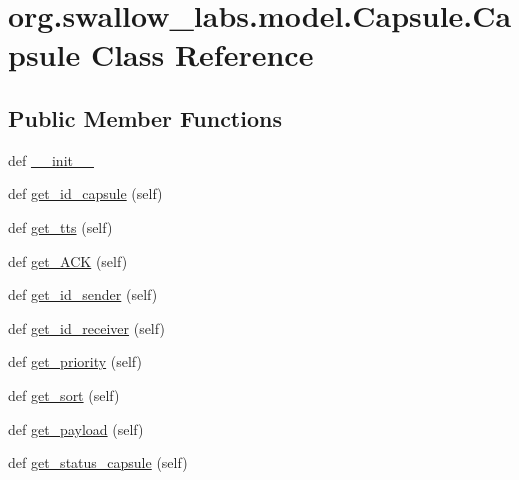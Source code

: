 \hypertarget{classorg_1_1swallow__labs_1_1model_1_1_capsule_1_1_capsule}{}\section{org.\+swallow\+\_\+labs.\+model.\+Capsule.\+Capsule Class Reference}
\label{classorg_1_1swallow__labs_1_1model_1_1_capsule_1_1_capsule}
\subsection*{Public Member Functions}
\begin{DoxyCompactItemize}
\item 
def \hyperlink{classorg_1_1swallow__labs_1_1model_1_1_capsule_1_1_capsule_a3dbf49bb0dee95d96d69f45d07dcffaf}{\+\_\+\+\_\+init\+\_\+\+\_\+}
\item 
def \hyperlink{classorg_1_1swallow__labs_1_1model_1_1_capsule_1_1_capsule_a3a1a40328823c7c3966528d43b2d0d84}{get\+\_\+id\+\_\+capsule} (self)
\item 
def \hyperlink{classorg_1_1swallow__labs_1_1model_1_1_capsule_1_1_capsule_a27bc4bb32feefe56085584994867a7ae}{get\+\_\+tts} (self)
\item 
def \hyperlink{classorg_1_1swallow__labs_1_1model_1_1_capsule_1_1_capsule_a9f37e86eb595e28f7d3021cb04b5bd1a}{get\+\_\+\+A\+C\+K} (self)
\item 
def \hyperlink{classorg_1_1swallow__labs_1_1model_1_1_capsule_1_1_capsule_ae9f636fc06a82fd3edba6863b5e88e18}{get\+\_\+id\+\_\+sender} (self)
\item 
def \hyperlink{classorg_1_1swallow__labs_1_1model_1_1_capsule_1_1_capsule_aa10e7f0cea0690ebc3f424a2135f89c2}{get\+\_\+id\+\_\+receiver} (self)
\item 
def \hyperlink{classorg_1_1swallow__labs_1_1model_1_1_capsule_1_1_capsule_aebdc8175e8e44f43bc3140b03a8a2b2a}{get\+\_\+priority} (self)
\item 
def \hyperlink{classorg_1_1swallow__labs_1_1model_1_1_capsule_1_1_capsule_a598d9838555b6419c51e47d97d80bd08}{get\+\_\+sort} (self)
\item 
def \hyperlink{classorg_1_1swallow__labs_1_1model_1_1_capsule_1_1_capsule_ac6e2b86663e5ad592720ce651e734d7b}{get\+\_\+payload} (self)
\item 
def \hyperlink{classorg_1_1swallow__labs_1_1model_1_1_capsule_1_1_capsule_a8d528ed7442c796ac432c20f9f86b075}{get\+\_\+status\+\_\+capsule} (self)

\end{DoxyCompactItemize}
